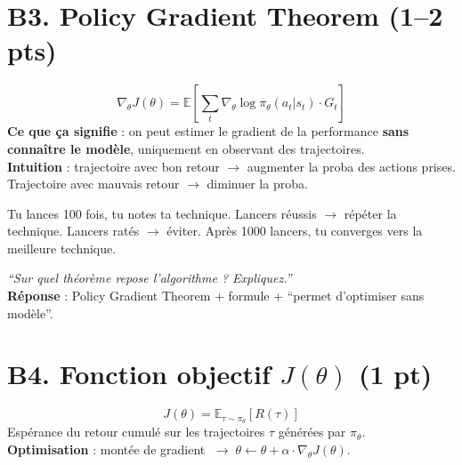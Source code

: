 \documentclass[11pt,a4paper]{article}
\newcommand{\E}{\mathbb{E}}
\begin{document}
\section{B3. Policy Gradient Theorem (1--2 pts)}

\begin{formbox}[Le théorème]
$$\boxed{\nabla_\theta J(\theta) = \E\!\left[\sum_t \nabla_\theta \log \pi_\theta(a_t|s_t) \cdot G_t\right]}$$
\textbf{Ce que ça signifie} : on peut estimer le gradient de la performance \textbf{sans connaître le modèle}, uniquement en observant des trajectoires.\\[4pt]
\textbf{Intuition} : trajectoire avec bon retour $\to$ augmenter la proba des actions prises.\\
Trajectoire avec mauvais retour $\to$ diminuer la proba.
\end{formbox}

\begin{exbox}
Tu lances 100 fois, tu notes ta technique. Lancers réussis $\to$ répéter la technique. Lancers ratés $\to$ éviter. Après 1000 lancers, tu converges vers la meilleure technique.
\end{exbox}

\begin{exambox}
\textit{``Sur quel théorème repose l'algorithme ? Expliquez.''}\\[4pt]
\textbf{Réponse} : Policy Gradient Theorem + formule + ``permet d'optimiser sans modèle''.
\end{exambox}

\section[B4. Fonction objectif J(theta) (1 pt)]{B4. Fonction objectif $J(\theta)$ (1 pt)}

\begin{formbox}[Définition]
$$\boxed{J(\theta) = \E_{\tau \sim \pi_\theta} \!\left[R(\tau)\right]}$$
Espérance du retour cumulé sur les trajectoires $\tau$ générées par $\pi_\theta$.\\
\textbf{Optimisation} : montée de gradient $\;\to\; \theta \leftarrow \theta + \alpha \cdot \nabla_\theta J(\theta)$.
\end{formbox}
\end{document}
